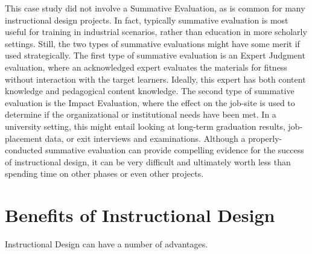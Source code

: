 This case study did not involve a Summative Evaluation, as is common for many instructional design projects.
In fact, typically summative evaluation is most useful for training in industrial scenarios, rather than education in more scholarly settings.
Still, the two types of summative evaluations might have some merit if used strategically.
The first type of summative evaluation is an Expert Judgment evaluation, where an acknowledged expert evaluates the materials for fitness without interaction with the target learners.
Ideally, this expert has both content knowledge and pedagogical content knowledge.
The second type of summative evaluation is the Impact Evaluation, where the effect on the job-site is used to determine if the organizational or institutional needs have been met.
In a university setting, this might entail looking at long-term graduation results, job-placement data, or exit interviews and examinations.
Although a properly-conducted summative evaluation can provide compelling evidence for the success of instructional design, it can be very difficult and ultimately worth less than spending time on other phases or even other projects.


\section{Benefits of Instructional Design}

Instructional Design can have a number of advantages. 

